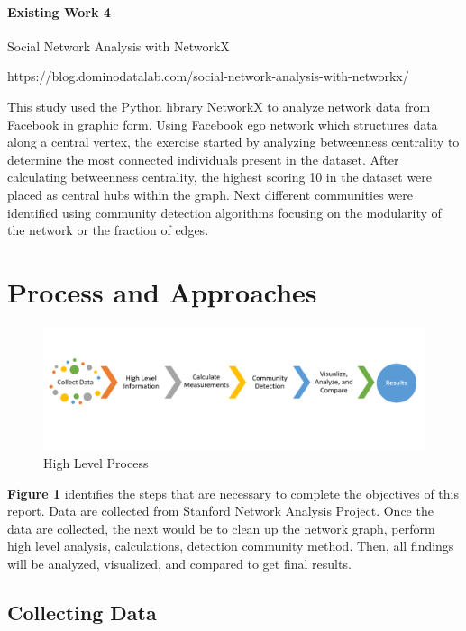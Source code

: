 \documentclass[11pt,twocolumn]{article}
\begin{document}
\paragraph{Existing Work 4 \cite{world-happiness-report-2018}} Social Network Analysis with NetworkX

https://blog.dominodatalab.com/social-network-analysis-with-networkx/

This study used the Python library NetworkX to analyze network data from Facebook in graphic form. Using Facebook ego network which structures data along a central vertex, the exercise started by analyzing betweenness centrality to determine the most connected individuals present in the dataset. After calculating betweenness centrality, the highest scoring 10 in the dataset were placed as central hubs within the graph. Next different communities were identified using community detection algorithms focusing on the modularity of the network or the fraction of edges. 


\section{Process and Approaches}

\begin{figure}[hbt!]
\includegraphics[scale=0.2]{process_flow.PNG} 
\caption{High Level Process}
\end{figure}

\textbf{Figure 1} identifies the steps that are necessary to complete the objectives of this report. Data are collected from Stanford Network Analysis Project. Once the data are collected, the next would be to clean up the network graph, perform high level analysis, calculations, detection community method. Then, all findings will be analyzed, visualized, and compared to get final results.

\subsection{Collecting Data}
\end{document}
